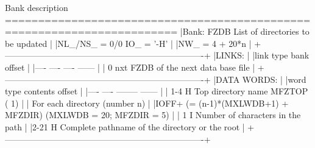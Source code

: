 \begin{XMPt}{Bank description}
========================================================================
|Bank:  FZDB                         List of directories to be updated |
|NL_/NS_ =  0/0                                             IO_ = '-H' |
|NW_     =  4 + 20*n                                                   |
+----------------------------------------------------------------------+
|LINKS:                                                                |
|link   type   bank                                        offset      |
|----   ----   ----                                        ------      |
|  0     nxt   FZDB of the next data base file                         |
+----------------------------------------------------------------------+
|DATA WORDS:                                                           |
|word  type  contents                                      offset      |
|----  ----  --------                                      ------      |
| 1-4    H   Top directory name                            MFZTOP ( 1) |
|      For each directory (number n)                                   |
|IOFF+      (= (n-1)*(MXLWDB+1) + MFZDIR)  (MXLWDB = 20; MFZDIR = 5)   |
|  1     I   Number of characters in the path                          |
|2-21    H   Complete pathname of the directory or the root            |
+----------------------------------------------------------------------+
\end{XMPt}

